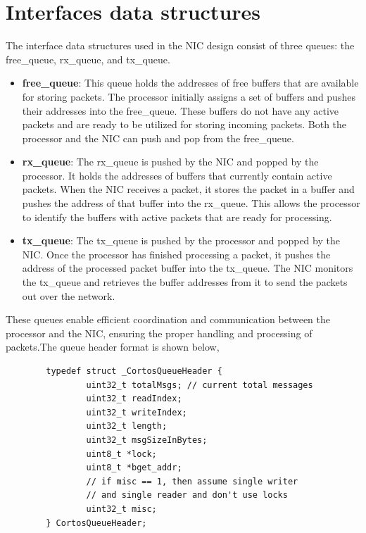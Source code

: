 \documentclass[a4paper,11pt, final]{report}
\begin{document}
	\section{Interfaces data structures}

		The interface data structures used in the NIC design consist of three queues: the free\_queue, rx\_queue, and tx\_queue.

	\begin{itemize}
		\item \textbf{free\_queue}: This queue holds the addresses of free buffers that are available for storing packets. The processor initially assigns a set of buffers and pushes their addresses into the free\_queue. These buffers do not have any active packets and are ready to be utilized for storing incoming packets. Both the processor and the NIC can push and pop from the free\_queue.\\

		\item \textbf{rx\_queue}: The rx\_queue is pushed by the NIC and popped by the processor. It holds the addresses of buffers that currently contain active packets. When the NIC receives a packet, it stores the packet in a buffer and pushes the address of that buffer into the rx\_queue. This allows the processor to identify the buffers with active packets that are ready for processing.

		\item \textbf{tx\_queue}: The tx\_queue is pushed by the processor and popped by the NIC. Once the processor has finished processing a packet, it pushes the address of the processed packet buffer into the tx\_queue. The NIC monitors the tx\_queue and retrieves the buffer addresses from it to send the packets out over the network.\\
	\end{itemize}

These queues enable efficient coordination and communication between the processor and the NIC, ensuring the proper handling and processing of packets.The queue header format is shown below,
		\begin{verbatim}
		typedef struct _CortosQueueHeader {
		        uint32_t totalMsgs; // current total messages
		        uint32_t readIndex;
		        uint32_t writeIndex;
		        uint32_t length;
		        uint32_t msgSizeInBytes;
		        uint8_t *lock;
		        uint8_t *bget_addr;
		        // if misc == 1, then assume single writer 
		        // and single reader and don't use locks
		        uint32_t misc;
		} CortosQueueHeader;
		\end{verbatim}
	
\end{document}
